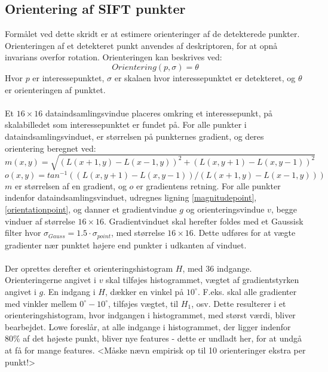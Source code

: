 \subsection{Orientering af SIFT punkter}
Formålet ved dette skridt er at estimere orienteringer af de detekterede punkter.
Orienteringen af et detekteret punkt anvendes af deskriptoren, for at opnå invarians overfor rotation. Orienteringen kan beskrives ved:
\begin{equation}
Orientering(p, \sigma) = \theta
\end{equation}
Hvor $p$ er interessepunktet, $\sigma$ er skalaen hvor interessepunktet er detekteret, og $\theta$ er orienteringen af punktet. 
\\
\\
Et $16\times16$ dataindsamlingsvindue placeres omkring et interessepunkt, på skalabilledet som interessepunktet er fundet på. For alle punkter i dataindsamlingsvinduet, er størrelsen på punkternes gradient, og deres orientering beregnet ved:
\begin{equation}
m(x,y) = \sqrt{(L(x + 1, y) - L(x - 1, y))^2 + (L(x, y + 1) - L(x, y - 1))^2} 
\label{magnitudepoint}
\end{equation}
\begin{equation}o(x,y) = tan^{-1}((L(x,y+1) - L(x,y-1))/(L(x+1, y) - L(x-1, y))) 
\label{orientationpoint}
\end{equation}
$m$ er størrelsen af en gradient, og $o$ er gradientens retning. For alle punkter indenfor dataindsamlingsvinduet, udregnes ligning
\eqref{magnitudepoint}, \eqref{orientationpoint}, og danner et gradientvindue $g$ og orienteringsvindue $v$, begge vinduer af størrelse $16\times16$. Gradientvinduet skal herefter foldes med et Gaussisk filter hvor $\sigma_{Gauss} = 1.5 \cdot \sigma_{point}$, med størrelse $16\times16$. Dette udføres for at vægte gradienter nær punktet højere end punkter i udkanten af vinduet.
\\
\\
Der oprettes derefter et orienteringshistogram $H$, med 36 indgange. Orienteringerne angivet i $v$ skal tilføjes histogrammet, vægtet af gradientstyrken angivet i $g$. En indgang i $H$, dækker en vinkel på $10^{\circ}$. F.eks. skal alle gradienter med vinkler mellem  $0^{\circ}-10^{\circ}$, tilføjes vægtet, til $H_1$, osv. Dette resulterer i et orienteringshistogram, hvor indgangen i histogrammet, med størst værdi, bliver bearbejdet. Lowe foreslår, at alle indgange i histogrammet, der ligger indenfor 80\% af det højeste punkt, bliver nye features - dette er undladt her, for at undgå at få for mange features. <Måske nævn empirisk op til 10 orienteringer ekstra per punkt!>
